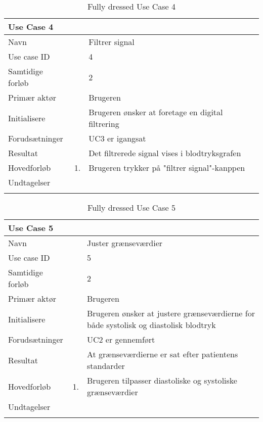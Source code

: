 \begin{longtabu} to  %
    {\large \textbf{Use Case 4}} && \\
    \toprule
    Navn &&    Filtrer signal\\
    Use case ID &&    4\\
    Samtidige forløb &&    2\\
    Primær aktør &&    Brugeren\\
    Initialisere &&    Brugeren ønsker at foretage en digital filtrering\\
    Forudsætninger && UC3 er igangsat\\
    Resultat &&    Det filtrerede signal vises i blodtryksgrafen                    \\ \midrule
    Hovedforløb &    1. &    Brugeren trykker på "filtrer signal"\--kanppen\\ \midrule               
    Undtagelser &    \\ \bottomrule
\caption{Fully dressed Use Case 4}
\label{UC4}
\end{longtabu}

\begin{longtabu} to  %
    {\large \textbf{Use Case 5}} && \\
    \toprule
    Navn &&    Juster grænseværdier\\
    Use case ID &&    5\\
    Samtidige forløb &&    2\\
    Primær aktør &&    Brugeren\\
    Initialisere &&    Brugeren ønsker at justere grænseværdierne for både systolisk og diastolisk blodtryk\\
    Forudsætninger && UC2 er gennemført\\
    Resultat &&    At grænseværdierne er sat efter patientens standarder                    \\ \midrule
    Hovedforløb &    1. &    Brugeren tilpasser diastoliske og systoliske grænseværdier\\ \midrule               
    Undtagelser &     &  \\  \bottomrule
\caption{Fully dressed Use Case 5}
\label{UC5}
\end{longtabu}


